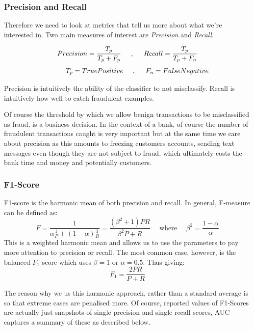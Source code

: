 \documentclass[12pt,a4paper,twoside]{report}
\begin{document}
\subsubsection{Precision and Recall}

Therefore we need to look at metrics that tell us more about what we're interested in. Two main measures of interest are \textit{Precision} and \textit{Recall}.

\[
    {Precision} = \frac{T_p}{T_p+F_p} \hspace{5mm} , \hspace{5mm} {Recall} = \frac{T_p}{T_p+F_n} 
\]
\[
	\hspace{1cm}  {T_p} = {True Positive} \hspace{5mm},\hspace{5mm} {F_n} = {False Negative}
\]

Precision is intuitively the ability of the classifier to not misclassify. Recall is intuitively how well to catch fraudulent examples. 

Of course the threshold by which we allow benign transactions to be misclassified as fraud, is a business decision. In the context of a bank, of course the number of fraudulent transactions caught is very important but at the same time we care about precision as this amounts to freezing customers accounts, sending text messages even though they are not subject to fraud, which ultimately costs the bank time and money and potentially customers.

\subsubsection{F1-Score}

F1-score is the harmonic mean of both precision and recall. In general, F-measure can be defined as:
$$F = \frac { 1} { \alpha \frac { 1} { P } + ( 1- \alpha ) \frac { 1} { R } } = \frac { \left( \beta ^ { 2} + 1\right) P R } { \beta ^ { 2} P + R } \quad \text{ where } \quad \beta ^ { 2} = \frac { 1- \alpha } { \alpha }$$
This is a weighted harmonic mean and allows us to use the parameters to pay more attention to precision or recall. The most common case, however, is the balanced $F_1$ score which uses $\beta = 1$ or $\alpha=0.5.$
Thus giving:
$$F _ { 1} = \frac { 2P R } { P + R }$$

The reason why we us this harmonic approach, rather than a standard average is so that extreme cases are penalised more. Of course, reported values of F1-Scores are actually just snapshots of single precision and single recall scores, AUC captures a summary of these as described below. 
\end{document}
